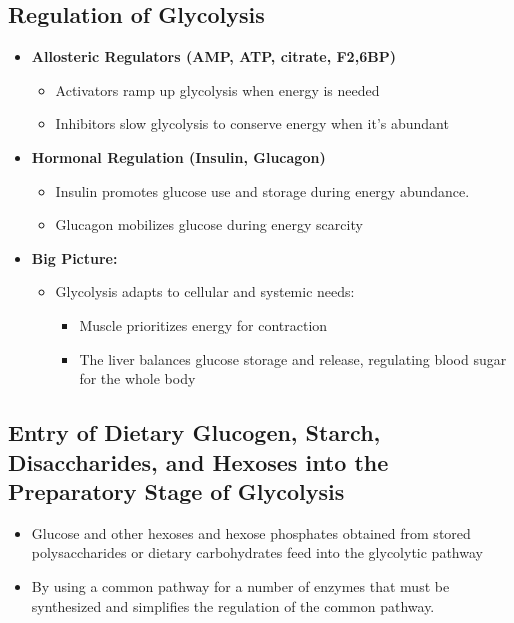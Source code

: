 \documentclass[10pt]{article}
\begin{document}
\subsection*{Regulation of Glycolysis}
\begin{itemize}
	\item \textbf{Allosteric Regulators (AMP, ATP, citrate, F2,6BP)}
	\begin{itemize}
        \item Activators ramp up glycolysis when energy is needed
        \item Inhibitors slow glycolysis to conserve energy when it's abundant
    \end{itemize}
	\item \textbf{Hormonal Regulation (Insulin, Glucagon)}
	\begin{itemize}
        \item Insulin promotes glucose use and storage during energy abundance.
        \item Glucagon mobilizes glucose during energy scarcity
    \end{itemize}
	\item \textbf{Big Picture:}
	\begin{itemize}
        \item Glycolysis adapts to cellular and systemic needs:
        \begin{itemize}
            \item Muscle prioritizes energy for contraction
            \item The liver balances glucose storage and release, regulating blood sugar for the whole body
        \end{itemize}
    \end{itemize}
\end{itemize}

\subsection*{Entry of Dietary Glucogen, Starch, Disaccharides, and Hexoses into the Preparatory Stage of Glycolysis}
\begin{itemize}
	\item Glucose and other hexoses and hexose phosphates obtained from stored polysaccharides or dietary carbohydrates feed into the glycolytic pathway
	\item By using a common pathway for a number of enzymes that must be synthesized and simplifies the regulation of the common pathway.
\end{itemize}
\end{document}
